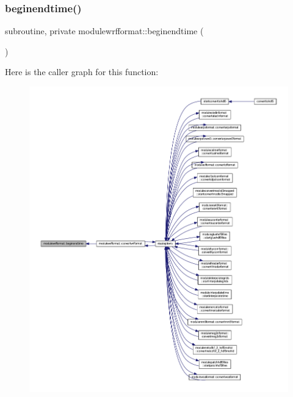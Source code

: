 \subsubsection{\texorpdfstring{beginendtime()}{beginendtime()}}
{\footnotesize\ttfamily subroutine, private modulewrfformat\+::beginendtime (\begin{DoxyParamCaption}{ }\end{DoxyParamCaption})\hspace{0.3cm}{\ttfamily [private]}}

Here is the caller graph for this function\+:\nopagebreak
\begin{figure}[H]
\begin{center}
\leavevmode
\includegraphics[width=350pt]{namespacemodulewrfformat_a28558eb5842cfa6977bae48d0fd73c4e_icgraph}
\end{center}
\end{figure}
\mbox{\label{namespacemodulewrfformat_a06aace8368c071a4250a6cebdbf4bba7}} 
